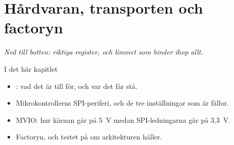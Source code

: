 \chapter{Hårdvaran, transporten och factoryn}
\label{ch:avr}


{\large\itshape Ned till botten: riktiga register, och limmet som binder ihop allt.\par}

\begin{chapterbox}{I det här kapitlet}
\begin{itemize}
  \item {}: vad det är till för, och var det får stå.
  \item Mikrokontrollerns SPI-periferi, och de tre inställningar som är fällor.
  \item MVIO: hur kärnan går på 5~V medan SPI-ledningarna går på 3,3~V.
  \item Factoryn, och testet på om arkitekturen håller.
\end{itemize}
\end{chapterbox}





